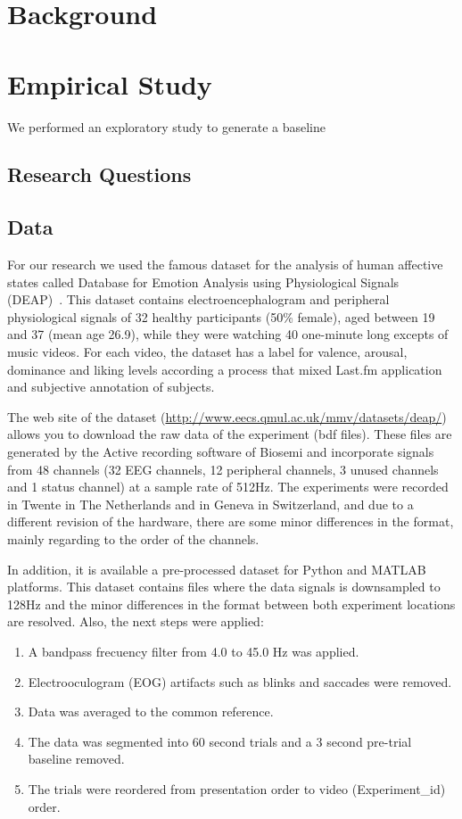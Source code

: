 \documentclass{sig-alternate}
\begin{document}
\section{Background}

\section{Empirical Study}
We performed an exploratory study to generate a baseline 


\subsection{Research Questions}
	
\subsection{Data}

For our research we used the famous dataset for the analysis of human affective states called
 Database for Emotion Analysis using Physiological Signals (DEAP)~\cite{deap2011}. This
 dataset contains electroencephalogram and peripheral physiological signals of 32 healthy
 participants (50\% female), aged between 19 and 37 (mean age 26.9), while they were watching
 40 one-minute long excepts of music videos. For each video, the dataset has a label for
 valence, arousal, dominance and liking levels according a process that mixed Last.fm application
 and subjective annotation of subjects. 

The web site of the dataset (\url{http://www.eecs.qmul.ac.uk/mmv/datasets/deap/}) allows
 you to download the raw data of the experiment (bdf files). These files are generated by the Active
 recording software of Biosemi and incorporate signals from 48 channels (32 EEG channels, 12 peripheral
 channels, 3 unused channels and 1 status channel) at a sample rate of 512Hz. The experiments were recorded
 in Twente in The Netherlands and in Geneva in Switzerland, and due to a different revision of the hardware,
 there are some minor differences in the format, mainly regarding to the order of the channels.
    
In addition, it is available a pre-processed dataset for Python and MATLAB platforms. This dataset contains
 files where the data signals is downsampled to 128Hz and the minor differences in the format between both
 experiment locations are resolved. Also, the next steps were applied:
\begin{enumerate}
\item A bandpass frecuency filter from 4.0 to 45.0 Hz was applied.
\item Electrooculogram (EOG) artifacts such as blinks and saccades were removed.
\item Data was averaged to the common reference.
\item The data was segmented into 60 second trials and a 3 second pre-trial baseline removed.
\item The trials were reordered from presentation order to video (Experiment\_id) order.
\end{enumerate} 
\end{document}
